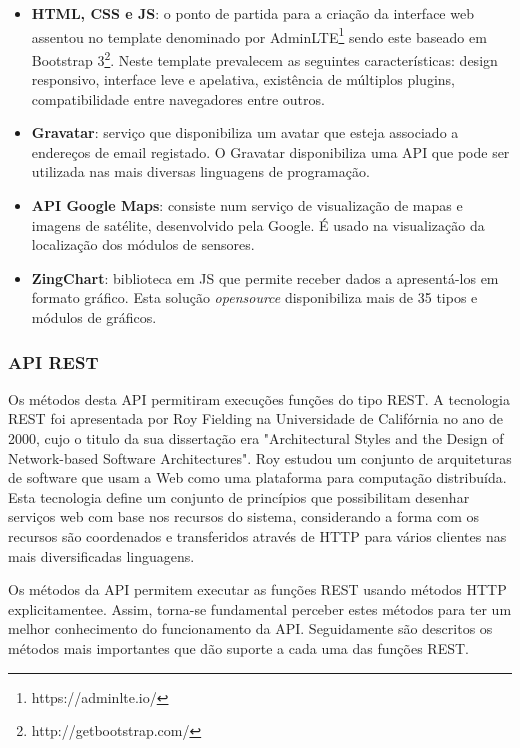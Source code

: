 \begin{itemize}
	\item \textbf{\acs{HTML}, \acs{CSS} e \acs{JS}}: o ponto de partida para a criação da interface web assentou no template denominado por AdminLTE\footnote{https://adminlte.io/} sendo este baseado em Bootstrap 3\footnote{http://getbootstrap.com/}. Neste template prevalecem as seguintes características:  design responsivo, interface leve e apelativa, existência de múltiplos plugins, compatibilidade entre navegadores entre outros. 
	
	\item \textbf{Gravatar}: serviço que disponibiliza um avatar que esteja associado a endereços de email registado. O Gravatar disponibiliza uma API que pode ser utilizada nas mais diversas linguagens de programação\cite{gravatar}.
	 
	\item \textbf{\ac{API} Google Maps}: consiste num serviço de visualização de mapas e imagens de satélite, desenvolvido pela Google. É usado na visualização da localização dos módulos de sensores. 
	
	\item \textbf{ZingChart}: biblioteca em \ac{JS} que permite receber dados a apresentá-los em formato gráfico. Esta solução \textit{opensource} disponibiliza mais de 35 tipos e módulos de gráficos. 
\end{itemize}





\subsubsection{\acs{API} \acs{REST}}


Os métodos desta \ac{API} permitiram execuções funções do tipo \ac{REST}. A tecnologia \ac{REST} foi apresentada por Roy Fielding na Universidade de Califórnia no ano de 2000, cujo o titulo da sua dissertação era "Architectural Styles and the Design of Network-based Software Architectures". Roy estudou um conjunto de arquiteturas de software que usam a Web como uma plataforma para computação distribuída\cite{restpaper}. Esta tecnologia define um conjunto de princípios que possibilitam desenhar serviços web com base nos recursos do sistema, considerando a forma com os recursos são coordenados e transferidos através de \ac{HTTP} para vários clientes nas mais diversificadas linguagens. 

Os métodos da API permitem executar as funções \ac{REST} usando métodos \ac{HTTP} explicitamentee. Assim, torna-se fundamental perceber estes métodos para ter um melhor conhecimento do funcionamento da \ac{API}. Seguidamente são descritos os métodos mais importantes que dão suporte a cada uma das funções \ac{REST}.


